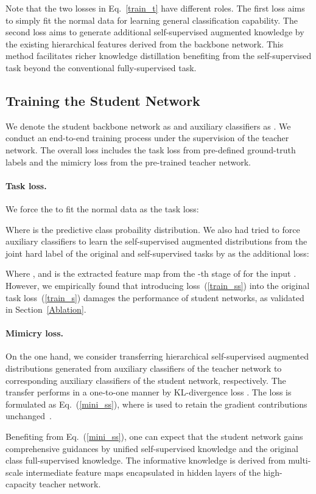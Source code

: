 \documentclass{article}
\begin{document}
Note that the two losses in Eq.~\ref{train_t} have different roles. The first loss aims to simply fit the normal data for learning general classification capability. The second loss aims to generate additional self-supervised augmented knowledge by the existing hierarchical features derived from the backbone network. This method facilitates richer knowledge distillation benefiting from the self-supervised task beyond the conventional fully-supervised task. 
\subsection{Training the Student Network}
We denote the student backbone network as  and  auxiliary classifiers as . We conduct an end-to-end training process under the supervision of the teacher network. The overall loss includes the task loss from pre-defined ground-truth labels and the mimicry loss from the pre-trained teacher network. 

\paragraph{Task loss.} We force the  to fit the normal data  as the task loss:

 Where  is the predictive class probaility distribution.
We also had tried to force  auxiliary classifiers  to learn the self-supervised augmented distributions from the joint hard label of the original and self-supervised tasks by  as the additional loss:

Where , and  is the extracted feature map from the -th stage of  for the input . However, we empirically found that introducing loss~(\ref{train_ss}) into the original task loss~(\ref{train_s}) damages the performance of student networks, as validated in Section~\ref{Ablation}.


\paragraph{Mimicry loss.} On the one hand, we consider transferring hierarchical self-supervised augmented distributions generated from  auxiliary classifiers of the teacher network to corresponding  auxiliary classifiers of the student network, respectively. The transfer performs in a one-to-one manner by KL-divergence loss . The loss is formulated as Eq.~(\ref{mini_ss}), where  is used to retain the gradient contributions unchanged~\cite{hinton2015distilling}.

Benefiting from Eq.~(\ref{mini_ss}), one can expect that the student network gains comprehensive guidances by unified self-supervised knowledge and the original class full-supervised knowledge. The informative knowledge is derived from multi-scale intermediate feature maps encapsulated in hidden layers of the high-capacity teacher network. 
\end{document}
